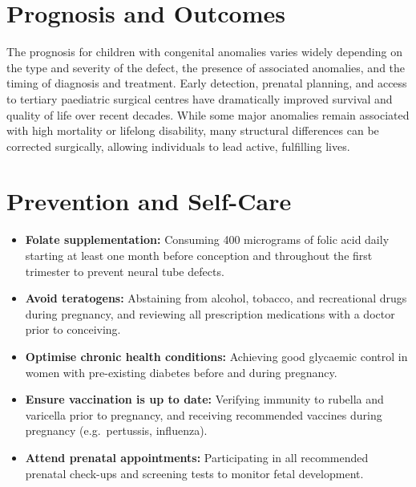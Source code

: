 \section*{Prognosis and Outcomes}
The prognosis for children with congenital anomalies varies widely depending on the type and severity of the defect, the presence of associated anomalies, and the timing of diagnosis and treatment. Early detection, prenatal planning, and access to tertiary paediatric surgical centres have dramatically improved survival and quality of life over recent decades. While some major anomalies remain associated with high mortality or lifelong disability, many structural differences can be corrected surgically, allowing individuals to lead active, fulfilling lives.

\section*{Prevention and Self-Care}
\begin{itemize}
    \item \textbf{Folate supplementation:} Consuming 400 micrograms of folic acid daily starting at least one month before conception and throughout the first trimester to prevent neural tube defects.
    \item \textbf{Avoid teratogens:} Abstaining from alcohol, tobacco, and recreational drugs during pregnancy, and reviewing all prescription medications with a doctor prior to conceiving.
    \item \textbf{Optimise chronic health conditions:} Achieving good glycaemic control in women with pre-existing diabetes before and during pregnancy.
    \item \textbf{Ensure vaccination is up to date:} Verifying immunity to rubella and varicella prior to pregnancy, and receiving recommended vaccines during pregnancy (e.g.\ pertussis, influenza).
    \item \textbf{Attend prenatal appointments:} Participating in all recommended prenatal check-ups and screening tests to monitor fetal development.
\end{itemize}

